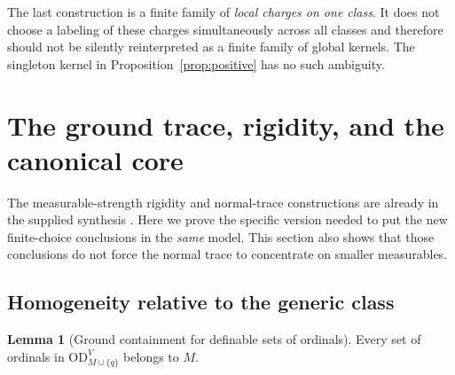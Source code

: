 \documentclass[11pt,letterpaper]{article}
\theoremstyle{definition}
\newtheorem{lemma}[definition]{Lemma}
\numberwithin{equation}{section}
\newcommand{\OD}{\mathrm{OD}}
\newcommand{\ODg}{\OD_{M\cup\{q\}}^{V}}
\begin{document}
The last construction is a finite family of \emph{local charges on one
class}. It does not choose a labeling of these charges simultaneously
across all classes and therefore should not be silently reinterpreted as
a finite family of global kernels. The singleton kernel in
Proposition~\ref{prop:positive} has no such ambiguity.

\section{The ground trace, rigidity, and the canonical core}\label{sec:core}

The measurable-strength rigidity and normal-trace constructions are already
in the supplied synthesis \cite[Section 13]{archive}. Here we prove the
specific version needed to put the new finite-choice conclusions in the
\emph{same} model. This section also shows that those conclusions do not
force the normal trace to concentrate on smaller measurables.

\subsection{Homogeneity relative to the generic class}

\begin{lemma}[Ground containment for definable sets of ordinals]\label{lem:groundOD}
Every set of ordinals in $\ODg$ belongs to $M$.
\end{lemma}
\end{document}
